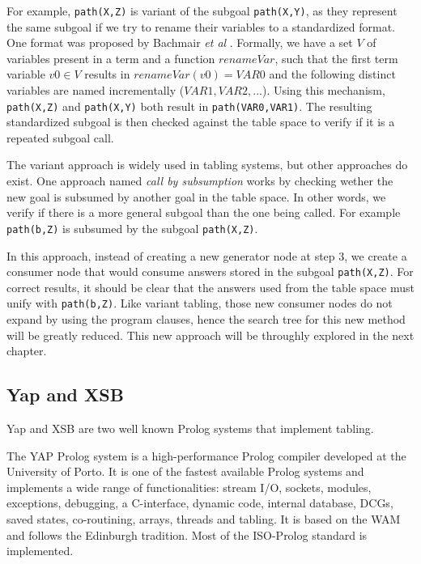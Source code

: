 For example, \texttt{path(X,Z)} is variant of the subgoal \texttt{path(X,Y)}, as they represent the same subgoal if we try
to rename their variables to a standardized format. One format was proposed by Bachmair \textit{et al} \cite{Bachmair-93}. Formally,
we have a set $V$ of variables present in a term and a function $renameVar$, such that the first term variable $v0 \in V$
results in $renameVar(v0) = VAR0$ and the following distinct variables are named incrementally ($VAR1, VAR2, ...$).
Using this mechanism, \texttt{path(X,Z)} and \texttt{path(X,Y)} both result in \texttt{path(VAR0,VAR1)}. The resulting
standardized subgoal is then checked against the table space to verify if it is a repeated subgoal call.

The variant approach is widely used in tabling systems, but other approaches do exist. One approach named
\textit{call by subsumption} works by checking wether the new goal is subsumed by another goal in the table space.
In other words, we verify if there is a more general subgoal than the one being called. For example
\texttt{path(b,Z)} is subsumed by the subgoal \texttt{path(X,Z)}.

In this approach, instead of creating
a new generator node at step 3, we create a consumer node that would consume answers stored in the subgoal \texttt{path(X,Z)}.
For correct results, it should be clear that the answers used from the table space must unify with \texttt{path(b,Z)}.
Like variant tabling, those new consumer nodes do not expand by using the program clauses, hence the search tree for this new
method will be greatly reduced. This new approach will be throughly explored in the next chapter.

  \subsection{Yap and XSB}
  
  Yap \cite{system-yap} and XSB \cite{system-xsb} are two well known Prolog systems that implement tabling.
  
  The YAP Prolog system is a high-performance Prolog compiler developed at the University of Porto.
  It is one of the fastest available Prolog systems and implements a wide range of functionalities: 
  stream I/O, sockets, modules, exceptions, debugging, a C-interface, dynamic code, internal database,
  DCGs, saved states, co-routining, arrays, threads and tabling.
  It is based on the WAM and follows the Edinburgh tradition. Most of the ISO-Prolog standard is implemented.
  
